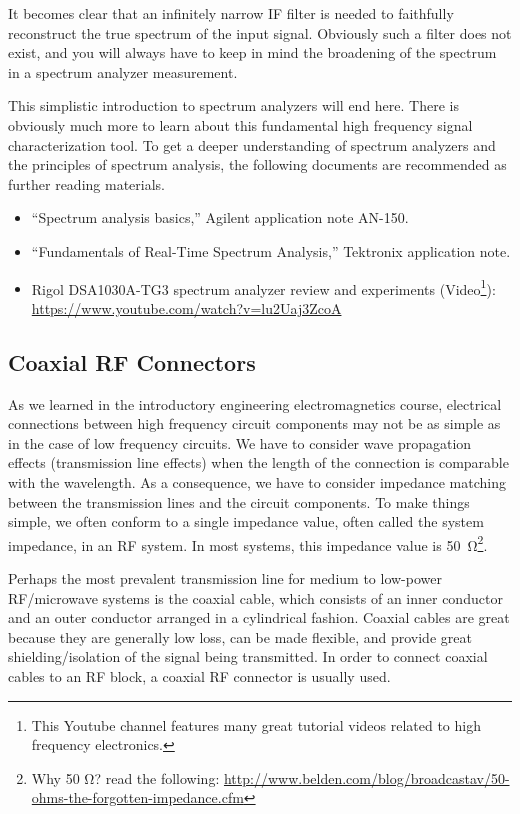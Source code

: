 \documentclass[letterpaper, 11pt]{article}
\begin{document}
It becomes clear that an infinitely narrow IF filter is needed to faithfully reconstruct the true spectrum of the input signal. Obviously such a filter does not exist, and you will always have to keep in mind the broadening of the spectrum in a spectrum analyzer measurement. 

This simplistic introduction to spectrum analyzers will end here. There is obviously much more to learn about this fundamental high frequency signal characterization tool. To get a deeper understanding of spectrum analyzers and the principles of spectrum analysis, the following documents are recommended as further reading materials. 

\begin{itemize}[itemsep=0.1ex]
	\item ``Spectrum analysis basics,'' Agilent application note AN-150.
	\item ``Fundamentals of Real-Time Spectrum Analysis,'' Tektronix application note.
	\item Rigol DSA1030A-TG3 spectrum analyzer review and experiments (Video\footnote{This Youtube channel features many great tutorial videos related to high frequency electronics.}):\\  \url{https://www.youtube.com/watch?v=lu2Uaj3ZcoA }
\end{itemize}

\subsection{Coaxial RF Connectors}
As we learned in the introductory engineering electromagnetics course, electrical connections between high frequency circuit components may not be as simple as in the case of low frequency circuits. We have to consider wave propagation effects (transmission line effects) when the length of the connection is comparable with the wavelength. As a consequence, we have to consider impedance matching between the transmission lines and the circuit components. To make things simple, we often conform to a single impedance value, often called the system impedance, in an RF system. In most systems, this impedance value is \SI{50}{\ohm}\footnote{Why 50 Ω? read the following: \url{http://www.belden.com/blog/broadcastav/50-ohms-the-forgotten-impedance.cfm}}. 

Perhaps the most prevalent transmission line for medium to low-power RF/microwave systems is the coaxial cable, which consists of an inner conductor and an outer conductor arranged in a cylindrical fashion. Coaxial cables are great because they are generally low loss, can be made flexible, and provide great shielding/isolation of the signal being transmitted. In order to connect coaxial cables to an RF block, a coaxial RF connector is usually used. 
\end{document}
